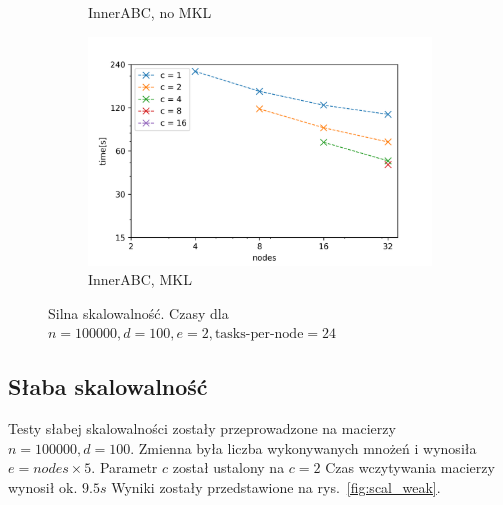 \documentclass{article}
\begin{document}
\begin{figure}[ht!]
\begin{subfigure}[b]{0.45\textwidth}
        \caption{InnerABC, no MKL}
    \end{subfigure}
    \begin{subfigure}[b]{0.45\textwidth}
        \includegraphics[width=\textwidth]{charts/s_100000_100_2_i_m}
        \caption{InnerABC, MKL}
    \end{subfigure}
    \caption{Silna skalowalność. Czasy dla $n=100000, d=100, e=2, \text{tasks-per-node}=24$}
    \label{fig:scal_strong_2}
\end{figure}

\subsection{Słaba skalowalność}

Testy słabej skalowalności zostały przeprowadzone na macierzy $n=100000, d=100$.
Zmienna była liczba wykonywanych mnożeń i wynosiła $e = nodes \times 5$.
Parametr $c$ został ustalony na $c=2$
Czas wczytywania macierzy wynosił ok. $9.5s$
Wyniki zostały przedstawione na rys.~\ref{fig:scal_weak}.
\end{document}
